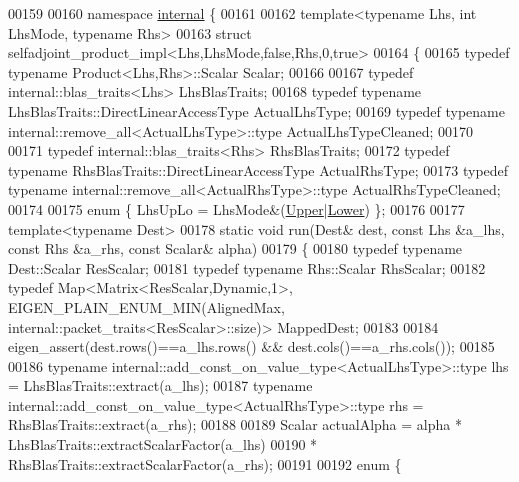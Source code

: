 \begin{DoxyCode}
00159 
00160 \textcolor{keyword}{namespace }\hyperlink{namespaceinternal}{internal} \{
00161 
00162 \textcolor{keyword}{template}<\textcolor{keyword}{typename} Lhs, \textcolor{keywordtype}{int} LhsMode, \textcolor{keyword}{typename} Rhs>
00163 \textcolor{keyword}{struct }selfadjoint\_product\_impl<Lhs,LhsMode,false,Rhs,0,true>
00164 \{
00165   \textcolor{keyword}{typedef} \textcolor{keyword}{typename} Product<Lhs,Rhs>::Scalar Scalar;
00166   
00167   \textcolor{keyword}{typedef} internal::blas\_traits<Lhs> LhsBlasTraits;
00168   \textcolor{keyword}{typedef} \textcolor{keyword}{typename} LhsBlasTraits::DirectLinearAccessType ActualLhsType;
00169   \textcolor{keyword}{typedef} \textcolor{keyword}{typename} internal::remove\_all<ActualLhsType>::type ActualLhsTypeCleaned;
00170   
00171   \textcolor{keyword}{typedef} internal::blas\_traits<Rhs> RhsBlasTraits;
00172   \textcolor{keyword}{typedef} \textcolor{keyword}{typename} RhsBlasTraits::DirectLinearAccessType ActualRhsType;
00173   \textcolor{keyword}{typedef} \textcolor{keyword}{typename} internal::remove\_all<ActualRhsType>::type ActualRhsTypeCleaned;
00174 
00175   \textcolor{keyword}{enum} \{ LhsUpLo = LhsMode&(\hyperlink{group__enums_gga39e3366ff5554d731e7dc8bb642f83cda6bcb58be3b8b8ec84859ce0c5ac0aaec}{Upper}|\hyperlink{group__enums_gga39e3366ff5554d731e7dc8bb642f83cda891792b8ed394f7607ab16dd716f60e6}{Lower}) \};
00176 
00177   \textcolor{keyword}{template}<\textcolor{keyword}{typename} Dest>
00178   \textcolor{keyword}{static} \textcolor{keywordtype}{void} run(Dest& dest, \textcolor{keyword}{const} Lhs &a\_lhs, \textcolor{keyword}{const} Rhs &a\_rhs, \textcolor{keyword}{const} Scalar& alpha)
00179   \{
00180     \textcolor{keyword}{typedef} \textcolor{keyword}{typename} Dest::Scalar ResScalar;
00181     \textcolor{keyword}{typedef} \textcolor{keyword}{typename} Rhs::Scalar RhsScalar;
00182     \textcolor{keyword}{typedef} Map<Matrix<ResScalar,Dynamic,1>, EIGEN\_PLAIN\_ENUM\_MIN(AlignedMax,
      internal::packet\_traits<ResScalar>::size)> MappedDest;
00183     
00184     eigen\_assert(dest.rows()==a\_lhs.rows() && dest.cols()==a\_rhs.cols());
00185 
00186     \textcolor{keyword}{typename} internal::add\_const\_on\_value\_type<ActualLhsType>::type lhs = LhsBlasTraits::extract(a\_lhs);
00187     \textcolor{keyword}{typename} internal::add\_const\_on\_value\_type<ActualRhsType>::type rhs = RhsBlasTraits::extract(a\_rhs);
00188 
00189     Scalar actualAlpha = alpha * LhsBlasTraits::extractScalarFactor(a\_lhs)
00190                                * RhsBlasTraits::extractScalarFactor(a\_rhs);
00191 
00192     \textcolor{keyword}{enum} \{

\end{DoxyCode}
